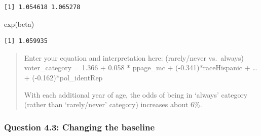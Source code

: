 \documentclass[
  letterpaper,
  DIV=11,
  numbers=noendperiod]{scrartcl}
\newenvironment{Shaded}{\begin{snugshade}}{\end{snugshade}}
\newcommand{\FloatTok}[1]{\textcolor[rgb]{0.68,0.00,0.00}{#1}}
\newcommand{\FunctionTok}[1]{\textcolor[rgb]{0.28,0.35,0.67}{#1}}
\newcommand{\NormalTok}[1]{\textcolor[rgb]{0.00,0.23,0.31}{#1}}
\newcommand{\OtherTok}[1]{\textcolor[rgb]{0.00,0.23,0.31}{#1}}
\newcommand{\SpecialCharTok}[1]{\textcolor[rgb]{0.37,0.37,0.37}{#1}}
\newcommand{\StringTok}[1]{\textcolor[rgb]{0.13,0.47,0.30}{#1}}
\begin{document}
\begin{Shaded}
\end{Shaded}

\begin{verbatim}
[1] 1.054618 1.065278
\end{verbatim}

\begin{Shaded}
\begin{Highlighting}[]
\FunctionTok{exp}\NormalTok{(beta)}
\end{Highlighting}
\end{Shaded}

\begin{verbatim}
[1] 1.059935
\end{verbatim}

\begin{quote}
Enter your equation and interpretation here: (rarely/never vs.~always)
voter\_category = 1.366 + 0.058 * ppage\_mc + (-0.341)*raceHispanic +
\ldots{} + (-0.162)*pol\_identRep

With each additional year of age, the odds of being in `always' category
(rather than `rarely/never' category) increases about 6\%.
\end{quote}

\subsubsection*{Question 4.3: Changing the
baseline}\label{question-4.3-changing-the-baseline}
\end{document}
